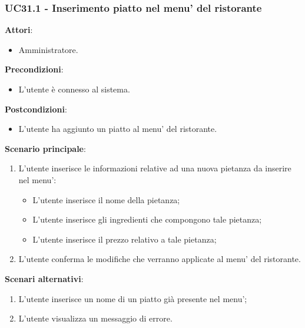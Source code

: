 \newpage
\subsubsection{UC31.1 - Inserimento piatto nel menu' del ristorante}\label{usecase:31_1}
\textbf{Attori}:
\begin{itemize}
    \item Amministratore.
\end{itemize}
\textbf{Precondizioni}:
\begin{itemize}
    \item L'utente è connesso al sistema.
\end{itemize}
\textbf{Postcondizioni}:
\begin{itemize}
    \item L’utente ha aggiunto un piatto al menu’ del ristorante.
\end{itemize}
\textbf{Scenario principale}:
\begin{enumerate}
    \item L'utente inserisce le informazioni relative ad una nuova pietanza da inserire nel menu':
    \begin{itemize}
        \item L'utente inserisce il nome della pietanza;
        \item L'utente inserisce gli ingredienti che compongono tale pietanza;
        \item L'utente inserisce il prezzo relativo a tale pietanza;
    \end{itemize}
    \item L'utente conferma le modifiche che verranno applicate al menu' del ristorante.
\end{enumerate}
\textbf{Scenari alternativi}: 
\begin{enumerate}
    \item L'utente inserisce un nome di un piatto già presente nel menu';
    \item L'utente visualizza un messaggio di errore.
\end{enumerate}